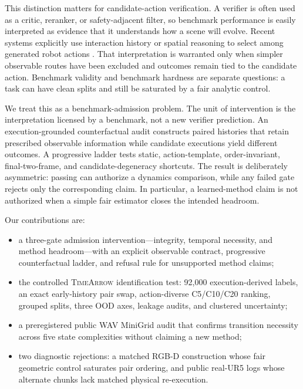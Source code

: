 \documentclass[letterpaper,10pt,conference]{ieeeconf}
\begin{document}
This distinction matters for candidate-action verification. A verifier is
often used as a critic, reranker, or safety-adjacent filter, so benchmark
performance is easily interpreted as evidence that it understands how a scene
will evolve. Recent systems explicitly use interaction history or spatial
reasoning to select among generated robot actions
\cite{li2025have,zhao2026verispace}. That interpretation is warranted only when
simpler observable routes have been excluded and outcomes remain tied to the candidate action.
Benchmark validity and benchmark hardness are separate questions: a task can
have clean splits and still be saturated by a fair analytic control.

We treat this as a benchmark-admission problem. The unit of intervention is
the interpretation licensed by a benchmark, not a new verifier prediction.
An execution-grounded counterfactual audit constructs paired histories that
retain prescribed observable information while candidate executions yield
different outcomes. A progressive ladder tests static, action-template,
order-invariant, final-two-frame, and candidate-degeneracy shortcuts. The
result is deliberately asymmetric: passing can authorize a dynamics
comparison, while any failed gate rejects only the corresponding claim. In
particular, a learned-method claim is not authorized when a simple fair
estimator closes the intended headroom.

Our contributions are:
\begin{itemize}
    \item a three-gate admission intervention---integrity, temporal necessity,
    and method headroom---with an explicit observable contract, progressive
    counterfactual ladder, and refusal rule for unsupported method claims;
    \item the controlled \textsc{TimeArrow} identification test: 92,000
    execution-derived labels, an exact early-history pair swap, action-diverse
    C5/C10/C20 ranking, grouped splits, three OOD axes, leakage audits, and
    clustered uncertainty;
    \item a preregistered public WAV MiniGrid audit that confirms transition
    necessity across five state complexities without claiming a new method;
    \item two diagnostic rejections: a matched RGB-D construction whose fair
    geometric control saturates pair ordering, and public real-UR5 logs whose
    alternate chunks lack matched physical re-execution.
\end{itemize}
\end{document}
